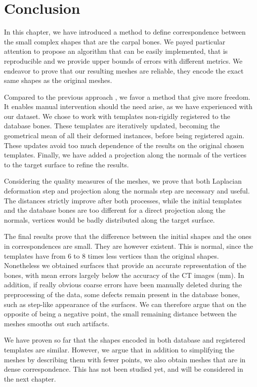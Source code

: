 \newpage
\section{Conclusion}
\label{sec:3_Conclusion}

In this chapter, we have introduced a method to define correspondence between the small complex shapes that are the carpal bones. We payed particular attention to propose an algorithm that can be easily implemented, that is reproducible and we provide upper bounds of errors with different metrics. We endeavor to prove that our resulting meshes are reliable, they encode the exact same shapes as the original meshes. 

Compared to the previous approach \cite{joshi_2016_registration-based}, we favor a method that give more freedom.%
It enables manual intervention should the need arise, as we have experienced with our dataset. We chose to work with templates non-rigidly registered to the database bones. These templates are iteratively updated, becoming the geometrical mean of all their deformed instances, before being registered again. These updates avoid too much dependence of the results on the original chosen templates. Finally, we have added a projection along the normals of the vertices to the target surface to refine the results. 

Considering the quality measures of the meshes, we prove that both Laplacian deformation step and projection along the normals step are necessary and useful. The distances strictly improve after both processes, while the initial templates and the database bones are too different for a direct projection along the normals, vertices would be badly distributed along the target surface.

The final results prove that the difference between the initial shapes and the ones in correspondences are small. They are however existent. This is normal, since the templates have from 6 to 8 times less vertices than the original shapes. Nonetheless we obtained surfaces that provide an accurate representation of the bones, with mean errors largely below the accuracy of the CT images (\precision* mm). In addition, if really obvious coarse errors have been manually deleted during the preprocessing of the data, some defects remain present in the database bones, such as step-like appearance of the surfaces. We can therefore argue that on the opposite of being a negative point, the small remaining distance between the meshes smooths out such artifacts. 

We have proven so far that the shapes encoded in both database and registered templates are similar. However, we argue that in addition to simplifying the meshes by describing them with fewer points, we also obtain meshes that are in dense correspondence. This has not been studied yet, and will be considered in the next chapter. 

